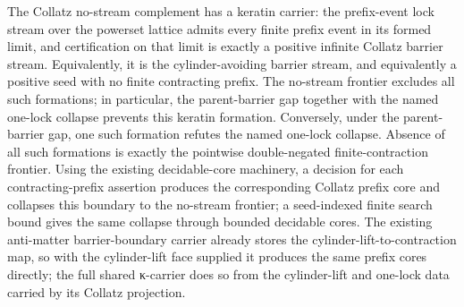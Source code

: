 \begin{theorem}
  \leanok
The Collatz no-stream complement has a keratin carrier: the prefix-event lock
stream over the powerset lattice admits every finite prefix event in its formed
limit, and certification on that limit is exactly a positive infinite Collatz
barrier stream. Equivalently, it is the cylinder-avoiding barrier stream, and
equivalently a positive seed with no finite contracting prefix. The no-stream
frontier excludes all such formations; in particular, the parent-barrier gap
together with the named one-lock collapse prevents this keratin formation.
Conversely, under the parent-barrier gap, one such formation refutes the named
one-lock collapse. Absence of all such formations is exactly the pointwise
double-negated finite-contraction frontier. Using the existing decidable-core
machinery, a decision for each contracting-prefix assertion produces the
corresponding Collatz prefix core and collapses this boundary to the no-stream
frontier; a seed-indexed finite search bound gives the same collapse through
bounded decidable cores. The existing anti-matter barrier-boundary carrier
already stores the cylinder-lift-to-contraction map, so with the cylinder-lift
face supplied it produces the same prefix cores directly; the full shared
κ-carrier does so from the cylinder-lift and one-lock data carried by its
Collatz projection.
\end{theorem}
